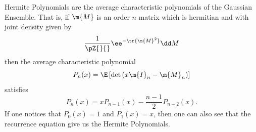 
Hermite Polynomials are the average characteristic polynomials of the Gaussian Ensemble. That is, if $\m{M}$ is an order $n$ matrix which is hermitian and with joint density given by
\begin{equation}
	\frac{1}{\pZ{}{}} \ee^{-\tr{\m{M}^2}} \dd M
\end{equation}
then the average characteristic polynomial
\begin{equation}
	P_n(x) = \E\left[\det\left( x \m{I}_n - \m{M}_n  \right)\right]
\end{equation}
satisfies
\begin{equation}
	P_n(x) = x P_{n-1}(x) - \frac{n-1}{2} P_{n-2}(x).
\end{equation}
If one notices that $P_0(x) = 1$ and $P_1(x) = x$, then one can also see that the recurrence equation give us the Hermite Polynomials.

